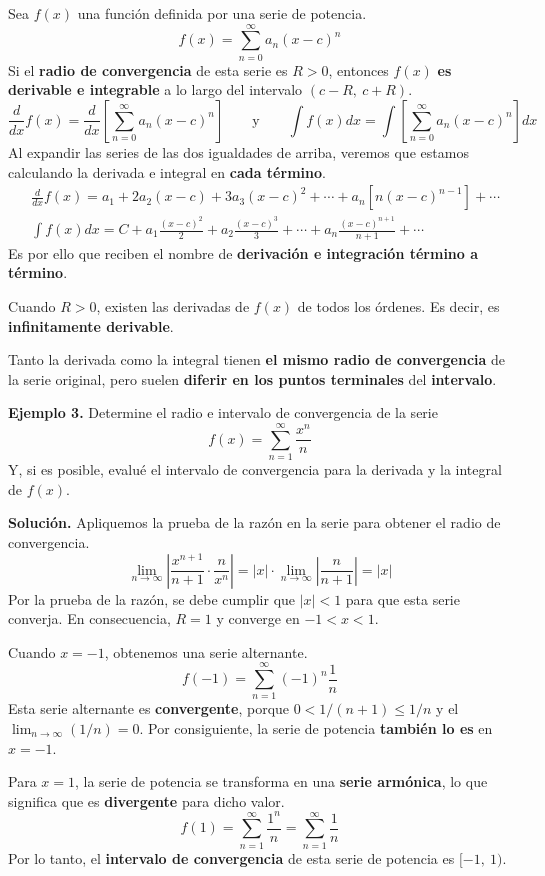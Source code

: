 \documentclass[12pt]{article}
\begin{document}
Sea $f(x)$ una función definida por una serie de potencia.
\[
  f(x) = \sum_{n = 0}^{\infty} a_{n} (x - c)^{n}
\]
Si el \textbf{radio de convergencia} de esta serie es $R > 0$, entonces $f(x)$ \textbf{es derivable e integrable} a lo largo del intervalo $(c - R, \ c + R)$.
\[
  \frac{d}{dx} f(x) = \frac{d}{dx} \left[\sum_{n = 0}^{\infty} a_{n} (x - c)^{n}\right]
  \qquad \text{y} \qquad
  \int f(x)dx = \int \left[\sum_{n = 0}^{\infty} a_{n} (x - c)^{n}\right] dx
\]
Al expandir las series de las dos igualdades de arriba, veremos que estamos calculando la derivada e integral en \textbf{cada término}.
\begin{align*}
  &\frac{d}{dx} f(x) = a_{1} + 2a_{2}(x - c) + 3a_{3}(x - c)^{2} + \cdots + a_{n} \left[n(x - c)^{n - 1}\right] + \cdots \\
  &\int f(x)dx = C + a_{1} \frac{(x - c)^{2}}{2} + a_{2} \frac{(x - c)^{3}}{3} + \cdots + a_{n} \frac{(x - c)^{n + 1}}{n + 1} + \cdots
\end{align*}
Es por ello que reciben el nombre de \textbf{derivación e integración término a término}.

Cuando $R > 0$, existen las derivadas de $f(x)$ de todos los órdenes. Es decir, es \textbf{infinitamente derivable}.

Tanto la derivada como la integral tienen \textbf{el mismo radio de convergencia} de la serie original, pero suelen \textbf{diferir en los puntos terminales} del \textbf{intervalo}.

\textbf{Ejemplo 3.} Determine el radio e intervalo de convergencia de la serie
\[
  f(x) = \sum_{n = 1}^{\infty} \frac{x^{n}}{n}
\]
Y, si es posible, evalué el intervalo de convergencia para la derivada y la integral de $f(x)$.

\textbf{Solución.} Apliquemos la prueba de la razón en la serie para obtener el radio de convergencia.
\[
\lim_{n \to \infty} \left|\frac{x^{n + 1}}{n + 1} \cdot \frac{n}{x^{n}}\right| =
  |x| \cdot \lim_{n \to \infty} \left|\frac{n}{n + 1}\right| =
  |x|
\]
Por la prueba de la razón, se debe cumplir que $|x| < 1$ para que esta serie converja. En consecuencia, $R = 1$ y converge en $-1 < x < 1$.

Cuando $x = -1$, obtenemos una serie alternante.
\[
  f(-1) = \sum_{n = 1}^{\infty} (-1)^{n} \frac{1}{n}
\]
Esta serie alternante es \textbf{convergente}, porque $0 < 1/(n + 1) \leq 1/n$ y el $\lim_{n \to \infty} (1/n) = 0$. Por consiguiente, la serie de potencia \textbf{también lo es} en $x = -1$.

Para $x = 1$, la serie de potencia se transforma en una \textbf{serie armónica}, lo que significa que es \textbf{divergente} para dicho valor.
\[
  f(1) = \sum_{n = 1}^{\infty} \frac{1^{n}}{n} = \sum_{n = 1}^{\infty} \frac{1}{n}
\]
Por lo tanto, el \textbf{intervalo de convergencia} de esta serie de potencia es $[-1, \ 1)$.
\end{document}
